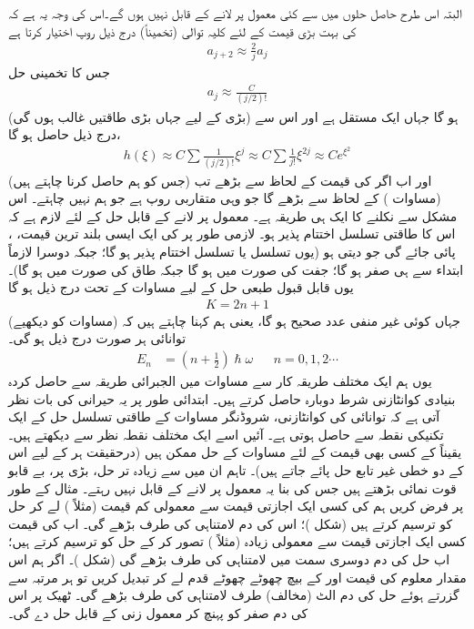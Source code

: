  البتہ اس طرح حاصل حلوں میں سے کئی معمول پر لانے کے قابل نہیں ہوں گے۔اس کی وجہ یہ ہے کہ  کی بہت بڑی قیمت کے لئے کلیہ توالی (تخمیناً) درج ذیل روپ اختیار کرتا ہے
\begin{align*}
a_{j+2}\approx\frac{2}{j}a_{j}
\end{align*}
جس کا تخمینی حل
\begin{align*}
a_{j}\approx\frac{C}{(j/2)!}
\end{align*}
ہو گا جہاں   ایک مستقل ہے اور اس سے (بڑی   کے لیے جہاں بڑی طاقتیں  غالب ہوں گی) درج ذیل حاصل ہو گا،
\begin{align*}
h(\xi)\approx C\sum\frac{1}{(j/2)!}\xi^{j}\approx C\sum\frac{1}{j!}\xi^{2j}\approx Ce^{\xi^{2}}
\end{align*}
اور اب اگر   کی  قیمت  کے لحاظ سے بڑھے تب  (جس کو ہم حاصل کرنا چاہتے ہیں) 
  (مساوات ) کے لحاظ سے بڑھے گا جو وہی متقاربی روپ ہے جو ہم نہیں چاہتے۔ اس مشکل سے نکلنے  کا ایک ہی طریقہ ہے۔ معمول پر لانے کے قابل حل کے لئے لازم ہے کہ اس کا طاقتی تسلسل اختتام پذیر ہو۔ لازمی طور پر   کی ایک ایسی بلند ترین قیمت، ،  پائی جائے گی جو  دیتی ہو (یوں   تسلسل یا   تسلسل اختتام پذیر  ہو گا؛ جبکہ  دوسرا لازماً ابتداء سے ہی صفر ہو گا؛ جفت  کی صورت میں  ہو گا جبکہ   طاق  کی صورت میں  ہو گا)۔  یوں قابل قبول طبعی حل کے لیے مساوات  کے تحت درج ذیل ہو گا
\begin{align*}
K=2n+1
\end{align*}
 جہاں  کوئی غیر منفی عدد صحیح ہو گا، یعنی ہم کہنا چاہتے ہیں کہ (مساوات  کو دیکھیے)  توانائی ہر صورت درج ذیل ہو گی۔
\begin{align}
E_{n}&=(n+\tfrac{1}{2} )\hslash\omega && n=0,1,2\cdots
\end{align}
یوں ہم  ایک  مختلف طریقہ کار سے مساوات  میں الجبرائی طریقہ سے حاصل کردہ بنیادی کوانٹازنی شرط دوبارہ حاصل کرتے ہیں۔ ابتدائی طور پر یہ حیرانی کی بات نظر آتی ہے کہ توانائی کی کوانٹازنی، شروڈنگر مساوات کے طاقتی تسلسل حل  کے ایک تکنیکی نقطہ سے حاصل ہوتی ہے۔ آئیں اسے ایک مختلف نقطہ نظر سے دیکھتے ہیں۔ یقیناً   کے کسی بھی قیمت کے لئے  مساوات  کے حل ممکن ہیں (درحقیقت ہر  کے لیے اس کے دو خطی  غیر تابع حل پائے جاتے ہیں)۔ تاہم ان میں سے زیادہ تر حل،  بڑی  پر، بے قابو قوت نمائی بڑھتے ہیں جس کی بنا یہ معمول پر لانے کے قابل نہیں رہتے۔ مثال کے طور پر فرض کریں ہم  کی کسی ایک اجازتی قیمت  سے معمولی کم   قیمت (مثلاً ) لے کر حل کو ترسیم کرتے ہیں (شکل )؛ اس کی دم لامتناہی کی طرف بڑھے گی۔ اب  کی قیمت کسی ایک اجازتی قیمت سے معمولی زیادہ  (مثلاً  )  تصور کر کے حل کو  ترسیم کرتے ہیں؛ اب حل کی دم دوسری سمت میں لامتناہی کی طرف
 بڑھے گی (شکل )۔  اگر  ہم اس مقدار معلوم کی قیمت  اور  کے بیچ چھوٹے  چھوٹے قدم لے کر تبدیل کریں تو ہر مرتبہ  سے گزرتے ہوئے  حل کی دم  الٹ (مخالف)  طرف لامتناہی کی طرف بڑھے گی۔ ٹھیک  پر اس کی دم صفر  کو پہنچ کر معمول زنی کے قابل حل دے گی۔

